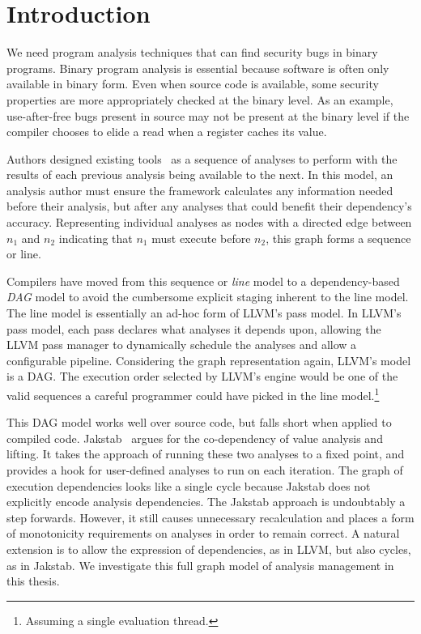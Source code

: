 \chapter{Introduction}
We need program analysis techniques that can find security bugs in binary programs.
Binary program analysis is essential because software is often only available in binary form.
Even when source code is available, some security properties are more appropriately checked at the binary level.
As an example, use-after-free bugs present in source may not be present at the binary level if the compiler chooses to elide a read when a register caches its value.

Authors designed existing tools~\cite{ida, bap, bitblaze, bindead} as a sequence of analyses to perform with the results of each previous analysis being available to the next.
In this model, an analysis author must ensure the framework calculates any information needed before their analysis, but after any analyses that could benefit their dependency's accuracy.
Representing individual analyses as nodes with a directed edge between $n_1$ and $n_2$ indicating that $n_1$ must execute before $n_2$, this graph forms a sequence or line.

Compilers have moved from this sequence or \emph{line} model to a dependency-based \emph{DAG} model to avoid the cumbersome explicit staging inherent to the line model.
The line model is essentially an ad-hoc form of LLVM\cite{llvm}'s pass model.
In LLVM's pass model, each pass declares what analyses it depends upon, allowing the LLVM pass manager to dynamically schedule the analyses and allow a configurable pipeline.
Considering the graph representation again, LLVM's model is a DAG.
The execution order selected by LLVM's engine would be one of the valid sequences a careful programmer could have picked in the line model.\footnote{Assuming a single evaluation thread.}

This DAG model works well over source code, but falls short when applied to compiled code.
Jakstab~\cite{jakstab} argues for the co-dependency of value analysis and lifting. 
It takes the approach of running these two analyses to a fixed point, and provides a hook for user-defined analyses to run on each iteration.
The graph of execution dependencies looks like a single cycle because Jakstab does not explicitly encode analysis dependencies.
The Jakstab approach is undoubtably a step forwards.
However, it still causes unnecessary recalculation and places a form of monotonicity requirements on analyses in order to remain correct.
A natural extension is to allow the expression of dependencies, as in LLVM, but also cycles, as in Jakstab.
We investigate this full graph model of analysis management in this thesis.

